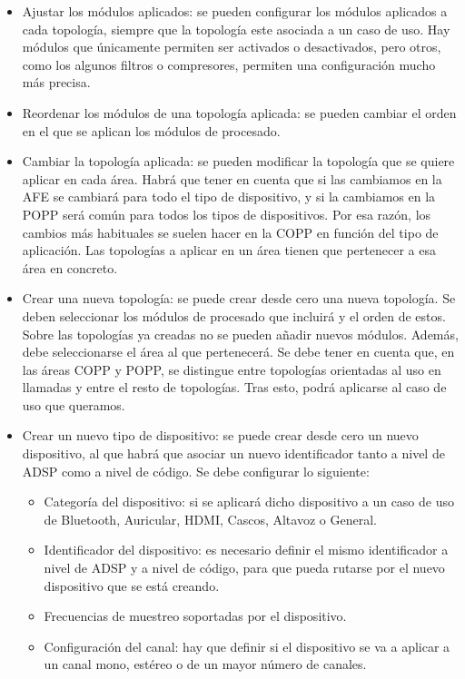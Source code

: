 \begin{itemize}
	\item{Ajustar los módulos aplicados: se pueden configurar los módulos aplicados a cada topología, siempre que la topología este asociada a un caso de uso. Hay módulos que únicamente permiten ser activados o desactivados, pero otros, como los algunos filtros o compresores, permiten una configuración mucho más precisa.}
	\item{Reordenar los módulos de una topología aplicada: se pueden cambiar el orden en el que se aplican los módulos de procesado.}
	\item{Cambiar la topología aplicada: se pueden modificar la topología que se quiere aplicar en cada área. Habrá que tener en cuenta que si las cambiamos en la \gls{AFE} se cambiará para todo el tipo de dispositivo, y si la cambiamos en la \gls{POPP} será común para todos los tipos de dispositivos. Por esa razón, los cambios más habituales se suelen hacer en la \gls{COPP} en función del tipo de aplicación. Las topologías a aplicar en un área tienen que pertenecer a esa área en concreto.}
	\item{Crear una nueva topología: se puede crear desde cero una nueva topología. Se deben seleccionar los módulos de procesado que incluirá y el orden de estos. Sobre las topologías ya creadas no se pueden añadir nuevos módulos. Además, debe seleccionarse el área al que pertenecerá. Se debe tener en cuenta que, en las áreas \gls{COPP} y \gls{POPP}, se distingue entre topologías orientadas al uso en llamadas y entre el resto de topologías. Tras esto, podrá aplicarse al caso de uso que queramos.}
	\item{Crear un nuevo tipo de dispositivo: se puede crear desde cero un nuevo dispositivo, al que habrá que
	asociar un nuevo identificador tanto a nivel de \gls{ADSP} como a nivel de código. Se debe configurar lo siguiente:}
	\begin{itemize}
		\item{Categoría del dispositivo: si se aplicará dicho dispositivo a un caso de uso de Bluetooth, Auricular, \gls{HDMI}, Cascos, Altavoz o General.}
		\item{Identificador del dispositivo: es necesario definir el mismo identificador a nivel de \gls{ADSP} y a nivel de código, para que pueda rutarse por el nuevo dispositivo que se está creando.}
		\item{Frecuencias de muestreo soportadas por el dispositivo.}
		\item{Configuración del canal: hay que definir si el dispositivo se va a aplicar a un canal mono, estéreo o de un mayor número de canales.}

\end{itemize}
\end{itemize}
